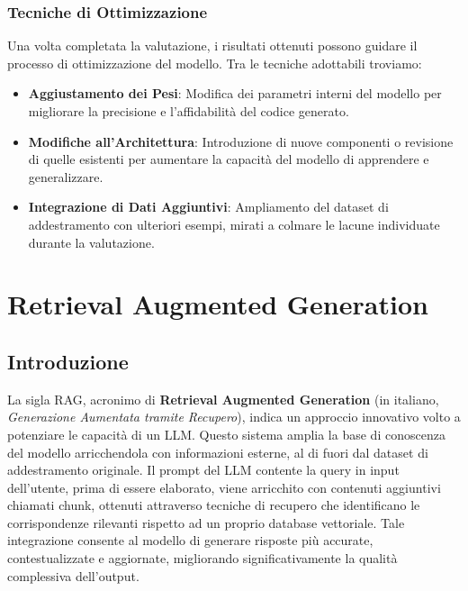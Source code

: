 \documentclass[12pt,a4paper,openright,twoside]{book}
\begin{document}
\subsection{Tecniche di Ottimizzazione}
Una volta completata la valutazione, i risultati ottenuti possono guidare il processo di ottimizzazione del modello. Tra le tecniche adottabili troviamo:
\begin{itemize}
    \item \textbf{Aggiustamento dei Pesi}: Modifica dei parametri interni del modello per migliorare la precisione e l'affidabilità del codice generato.
    \item \textbf{Modifiche all'Architettura}: Introduzione di nuove componenti o revisione di quelle esistenti per aumentare la capacità del modello di apprendere e generalizzare.
    \item \textbf{Integrazione di Dati Aggiuntivi}: Ampliamento del dataset di addestramento con ulteriori esempi, mirati a colmare le lacune individuate durante la valutazione.
\end{itemize}
\chapter{Retrieval Augmented Generation}
\section{Introduzione} 
La sigla RAG, acronimo di \textbf{Retrieval Augmented Generation} (in italiano, \textit{Generazione Aumentata tramite Recupero}), indica un approccio innovativo volto a potenziare le capacità di un \ac{LLM}.
Questo sistema amplia la base di conoscenza del modello arricchendola con informazioni esterne, al di fuori dal dataset di addestramento originale.
Il prompt del \ac{LLM} contente la query in input dell'utente, prima di essere elaborato, viene arricchito con contenuti aggiuntivi chiamati chunk, ottenuti attraverso tecniche di recupero che identificano le corrispondenze rilevanti rispetto ad un proprio database vettoriale.
Tale integrazione consente al modello di generare risposte più accurate, contestualizzate e aggiornate, migliorando significativamente la qualità complessiva dell’output.
\end{document}
